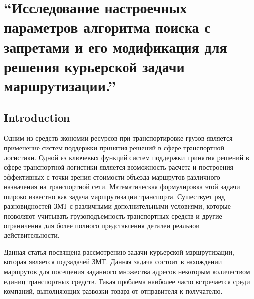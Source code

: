 \documentclass[]{TAACpaper}
\begin{document}

\def\dd#1#2{\frac{\partial#1}{\partial#2}}
\section{
``Исследование  настроечных параметров алгоритма поиска с запретами и его модификация для решения курьерской задачи маршрутизации.'' 
}



\subsection{Introduction}
Одним из средств экономии ресурсов при транспортировке грузов является применение систем поддержки принятия решений в сфере транспортной логистики. Одной из ключевых функций систем поддержки принятия решений в сфере транспортной логистики является возможность расчета и построения эффективных с точки зрения стоимости объезда маршрутов различного назначения на транспортной сети. Математическая формулировка этой задачи широко известно как задача маршрутизации транспорта. Существует ряд разновидностей ЗМТ с различными дополнительными условиями, которые позволяют учитывать грузоподъемность транспортных средств и другие ограничения для более полного представления деталей реальной действительности.

Данная статья посвящена рассмотрению задачи курьерской маршрутизации, которая является подзадачей ЗМТ. Данная задача состоит в нахождении маршрутов для посещения заданного множества адресов некоторым количеством единиц транспортных средств. Такая проблема наиболее часто встречается среди компаний, выполняющих развозки товара от отправителя к получателю. 
\end{document}
